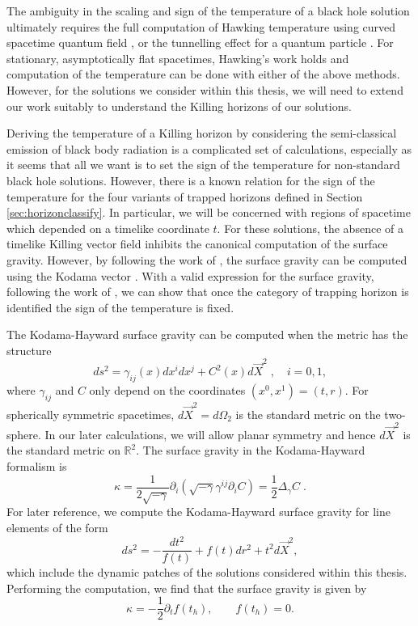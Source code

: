 The ambiguity in the scaling and sign of the temperature of a black hole solution ultimately requires the full computation of Hawking temperature using curved spacetime quantum field \cite{Hawking:1974sw}, or the tunnelling effect for a quantum particle \cite{Parikh:1999mf}. For stationary, asymptotically flat spacetimes, Hawking's work holds and computation of the temperature can be done with either of the above methods. However, for the solutions we consider within this thesis, we will need to extend our work suitably to understand the Killing horizons of our solutions. 

Deriving the temperature of a Killing horizon by considering the semi-classical emission of black body radiation is a complicated set of calculations, especially as it seems that all we want is to set the sign of the temperature for non-standard black hole solutions. However, there is a known relation for the sign of the temperature for the four variants of trapped horizons defined in Section \ref{sec:horizonclassify}. In particular, we will be concerned with regions of spacetime which depended on a timelike coordinate $t$. For these solutions, the absence of a timelike Killing vector field inhibits the canonical computation of the surface gravity. However, by following the work of \cite{Hayward:1997jp}, the surface gravity can be computed using the Kodama vector \cite{Kodama:1980}. With a valid expression for the surface gravity, following the work of \cite{Binetruy:2014ela, Helou:2015zma}, we can show that once the category of trapping horizon is identified the sign of the temperature is fixed.

The Kodama-Hayward surface gravity can be computed when the metric has the structure
\begin{equation*}
    ds^2 = \gamma_{ij}(x) dx^i dx^j + C^2(x) d\vec{X}^2 \;,\quad i=0,1,
\end{equation*}
where $\gamma_{ij}$ and $C$ only depend on the coordinates $(x^0,x^1) = (t,r)$. For spherically symmetric spacetimes, $d\vec{X}^2 = d\Omega_2$ is the standard metric on the two-sphere. In our later calculations, we will allow planar symmetry and hence $d\vec{X}^2$ is the standard metric on $\mathbb{R}^2$. The surface gravity in the Kodama-Hayward formalism is
\begin{equation*}
    \kappa = \frac{1}{2 \sqrt{-\gamma}} \partial_i \left(\sqrt{-\gamma} \gamma^{ij} \partial_i C 
    \right) = \frac{1}{2}
    \Delta_\gamma C \;.
\end{equation*}
For later reference, we compute the Kodama-Hayward surface gravity for line elements
of the form 
\begin{equation*}
    ds^2 = - \frac{dt^2}{f(t)} + f(t) dr^2 + t^2 d\vec{X}^2,
\end{equation*}
which include the dynamic patches of the solutions considered within this thesis. Performing the computation, we find that the surface gravity is given by
\begin{equation}
\label{eq:THK}
\kappa = -\frac{1}{2} \partial_t f(t_h), \qquad f(t_h) = 0.
\end{equation}

